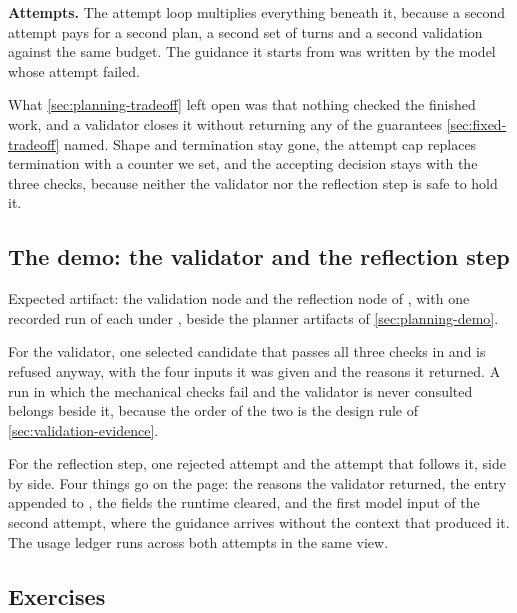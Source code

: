 \item \textbf{Attempts.} The attempt loop multiplies everything beneath it, because a second attempt
pays for a second plan, a second set of turns and a second validation against the same budget. The
guidance it starts from was written by the model whose attempt failed.

\ei

What \cref{sec:planning-tradeoff} left open was that nothing checked the finished work, and a
validator closes it without returning any of the guarantees \cref{sec:fixed-tradeoff} named. Shape
and termination stay gone, the attempt cap replaces termination with a counter we set, and the
accepting decision stays with the three checks, because neither the validator nor the reflection
step is safe to hold it.

\subsection{The demo: the validator and the reflection step}
\label{sec:validation-demo}

\begin{demostub}
Expected artifact: the validation node and the reflection node of
, with one recorded run of each under
, beside the planner artifacts of \cref{sec:planning-demo}.

For the validator, one selected candidate that passes all three checks in  and is
refused anyway, with the four inputs it was given and the reasons it returned. A run in which the
mechanical checks fail and the validator is never consulted belongs beside it, because the order of
the two is the design rule of \cref{sec:validation-evidence}.

For the reflection step, one rejected attempt and the attempt that follows it, side by side. Four
things go on the page: the reasons the validator returned, the entry appended to
, the fields the runtime cleared, and the first model input of the second
attempt, where the guidance arrives without the context that produced it. The usage ledger runs
across both attempts in the same view.
\end{demostub}

\subsection{Exercises}

